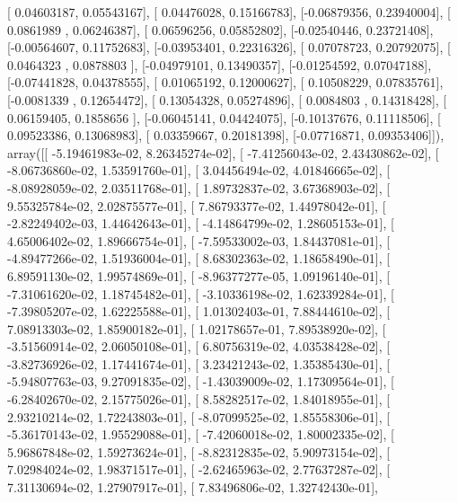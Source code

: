 \documentclass{article}
\begin{document}
       [ 0.04603187,  0.05543167],
       [ 0.04476028,  0.15166783],
       [-0.06879356,  0.23940004],
       [ 0.0861989 ,  0.06246387],
       [ 0.06596256,  0.05852802],
       [-0.02540446,  0.23721408],
       [-0.00564607,  0.11752683],
       [-0.03953401,  0.22316326],
       [ 0.07078723,  0.20792075],
       [ 0.0464323 ,  0.0878803 ],
       [-0.04979101,  0.13490357],
       [-0.01254592,  0.07047188],
       [-0.07441828,  0.04378555],
       [ 0.01065192,  0.12000627],
       [ 0.10508229,  0.07835761],
       [-0.0081339 ,  0.12654472],
       [ 0.13054328,  0.05274896],
       [ 0.0084803 ,  0.14318428],
       [ 0.06159405,  0.1858656 ],
       [-0.06045141,  0.04424075],
       [-0.10137676,  0.11118506],
       [ 0.09523386,  0.13068983],
       [ 0.03359667,  0.20181398],
       [-0.07716871,  0.09353406]]), array([[ -5.19461983e-02,   8.26345274e-02],
       [ -7.41256043e-02,   2.43430862e-02],
       [ -8.06736860e-02,   1.53591760e-01],
       [  3.04456494e-02,   4.01846665e-02],
       [ -8.08928059e-02,   2.03511768e-01],
       [  1.89732837e-02,   3.67368903e-02],
       [  9.55325784e-02,   2.02875577e-01],
       [  7.86793377e-02,   1.44978042e-01],
       [ -2.82249402e-03,   1.44642643e-01],
       [ -4.14864799e-02,   1.28605153e-01],
       [  4.65006402e-02,   1.89666754e-01],
       [ -7.59533002e-03,   1.84437081e-01],
       [ -4.89477266e-02,   1.51936004e-01],
       [  8.68302363e-02,   1.18658490e-01],
       [  6.89591130e-02,   1.99574869e-01],
       [ -8.96377277e-05,   1.09196140e-01],
       [ -7.31061620e-02,   1.18745482e-01],
       [ -3.10336198e-02,   1.62339284e-01],
       [ -7.39805207e-02,   1.62225588e-01],
       [  1.01302403e-01,   7.88444610e-02],
       [  7.08913303e-02,   1.85900182e-01],
       [  1.02178657e-01,   7.89538920e-02],
       [ -3.51560914e-02,   2.06050108e-01],
       [  6.80756319e-02,   4.03538428e-02],
       [ -3.82736926e-02,   1.17441674e-01],
       [  3.23421243e-02,   1.35385430e-01],
       [ -5.94807763e-03,   9.27091835e-02],
       [ -1.43039009e-02,   1.17309564e-01],
       [ -6.28402670e-02,   2.15775026e-01],
       [  8.58282517e-02,   1.84018955e-01],
       [  2.93210214e-02,   1.72243803e-01],
       [ -8.07099525e-02,   1.85558306e-01],
       [ -5.36170143e-02,   1.95529088e-01],
       [ -7.42060018e-02,   1.80002335e-02],
       [  5.96867848e-02,   1.59273624e-01],
       [ -8.82312835e-02,   5.90973154e-02],
       [  7.02984024e-02,   1.98371517e-01],
       [ -2.62465963e-02,   2.77637287e-02],
       [  7.31130694e-02,   1.27907917e-01],
       [  7.83496806e-02,   1.32742430e-01],
\end{document}
